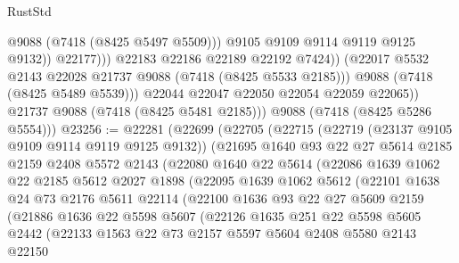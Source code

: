 \begin{lexlean}{RustStd}
\begin{coremodule}
                              @9088
                              (@7418 (@8425 @5497 @5509)))
                            @9105
                            @9109
                            @9114
                            @9119
                            @9125
                            @9132))
                        @22177)))
                  @22183
                  @22186
                  @22189
                  @22192
                  @7424))
              (@22017 @5532 @2143 @22028 @21737 @9088 (@7418 (@8425 @5533 @2185)))
              @9088
              (@7418 (@8425 @5489 @5539)))
            @22044
            @22047
            @22050
            @22054
            @22059
            @22065))
        @21737
        @9088
        (@7418 (@8425 @5481 @2185)))
      @9088
      (@7418 (@8425 @5286 @5554)))
@23256 := @22281
    (@22699
      (@22705
        (@22715
          (@22719 (@23137 @9105 @9109 @9114 @9119 @9125 @9132))
          (@21695
            @1640
            @93
            @22
            @27
            @5614
            @2185
            @2159
            @2408
            @5572
            @2143
            (@22080
              @1640
              @22
              @5614
              (@22086
                @1639
                @1062
                @22
                @2185
                @5612
                @2027
                @1898
                (@22095
                  @1639
                  @1062
                  @5612
                  (@22101
                    @1638
                    @24
                    @73
                    @2176
                    @5611
                    @22114
                    (@22100
                      @1636
                      @93
                      @22
                      @27
                      @5609
                      @2159
                      (@21886
                        @1636
                        @22
                        @5598
                        @5607
                        (@22126
                          @1635
                          @251
                          @22
                          @5598
                          @5605
                          @2442
                          (@22133
                            @1563
                            @22
                            @73
                            @2157
                            @5597
                            @5604
                            @2408
                            @5580
                            @2143
                            @22150

\end{coremodule}
\end{lexlean}
